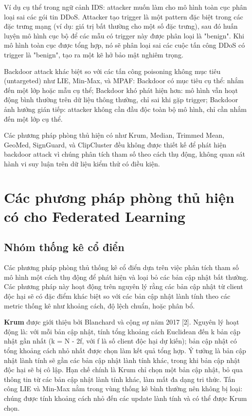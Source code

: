 Ví dụ cụ thể trong ngữ cảnh IDS: attacker muốn làm cho mô hình toàn cục phân loại sai các gói tin DDoS. Attacker tạo trigger là một pattern đặc biệt trong các đặc trưng mạng (ví dụ: giá trị bất thường cho một số đặc trưng), sau đó huấn luyện mô hình cục bộ để các mẫu có trigger này được phân loại là "benign". Khi mô hình toàn cục được tổng hợp, nó sẽ phân loại sai các cuộc tấn công DDoS có trigger là "benign", tạo ra một kẽ hở bảo mật nghiêm trọng.

Backdoor attack khác biệt so với các tấn công poisoning không mục tiêu (untargeted) như LIE, Min-Max, và MPAF: Backdoor có mục tiêu cụ thể: nhắm đến một lớp hoặc mẫu cụ thể; Backdoor khó phát hiện hơn: mô hình vẫn hoạt động bình thường trên dữ liệu thông thường, chỉ sai khi gặp trigger; Backdoor ảnh hưởng gián tiếp: attacker không cần đầu độc toàn bộ mô hình, chỉ cần nhắm đến một lớp cụ thể.

Các phương pháp phòng thủ hiện có như Krum, Median, Trimmed Mean, GeoMed, SignGuard, và ClipCluster đều không được thiết kế để phát hiện backdoor attack vì chúng phân tích tham số theo cách thụ động, không quan sát hành vi suy luận trên dữ liệu kiểm thử có điều kiện.

\section{Các phương pháp phòng thủ hiện có cho Federated Learning}

\subsection{Nhóm thống kê cổ điển}
Các phương pháp phòng thủ thống kê cổ điển dựa trên việc phân tích tham số mô hình một cách thụ động để phát hiện và loại bỏ các bản cập nhật bất thường. Các phương pháp này hoạt động trên nguyên lý rằng các bản cập nhật từ client độc hại sẽ có đặc điểm khác biệt so với các bản cập nhật lành tính theo các metric thống kê như khoảng cách, độ lệch chuẩn, hoặc phân bổ.

\textbf{Krum} được giới thiệu bởi Blanchard và cộng sự năm 2017 {[}2{]}. Nguyên lý hoạt động là: với mỗi bản cập nhật, tính tổng khoảng cách Euclidean đến k bản cập nhật gần nhất (k = N - 2f, với f là số client độc hại dự kiến); bản cập nhật có tổng khoảng cách nhỏ nhất được chọn làm kết quả tổng hợp. Ý tưởng là bản cập nhật lành tính sẽ gần các bản cập nhật lành tính khác, trong khi bản cập nhật độc hại sẽ bị cô lập. Hạn chế chính là Krum chỉ chọn một bản cập nhật, bỏ qua thông tin từ các bản cập nhật lành tính khác, làm mất đa dạng tri thức. Tấn công LIE và Min-Max nằm trong vùng thống kê bình thường nên không bị loại: chúng được tính khoảng cách nhỏ đến các update lành tính và có thể được Krum chọn.

